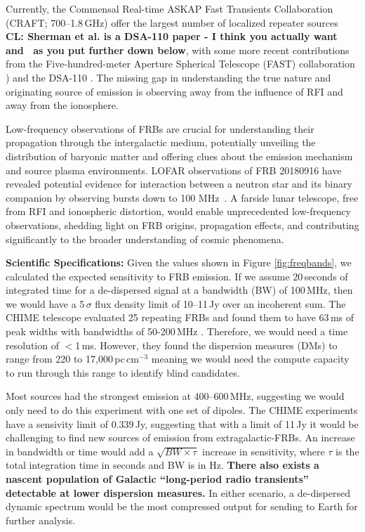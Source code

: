 Currently, the Commensal Real-time ASKAP Fast Transients Collaboration (CRAFT; 700--1.8\,GHz) offer the largest number of localized repeater sources \citep{SM_2023} \textbf{CL: Sherman et al. is a DSA-110 paper - I think you actually want~\citep{shannon2024ics} and~\citep{SD_2023} as you put further down below}, with some more recent contributions from the Five-hundred-meter Aperture Spherical Telescope (FAST) collaboration \citep[1.00--1.45\,GHz;][]{ZX_2023}) and the DSA-110 \citep{LC_2023,sharma2024preferential}. The missing gap in understanding the true nature and originating source of emission is observing away from the influence of RFI and away from the ionosphere.

Low-frequency observations of FRBs are crucial for understanding their propagation through the intergalactic medium, potentially unveiling the distribution of baryonic matter and offering clues about the emission mechanism and source plasma environments. LOFAR observations of FRB 20180916 have revealed potential evidence for interaction between a neutron star and its binary companion by observing bursts down to 100 MHz~\citep{pleunis2021lofar}. A farside lunar telescope, free from RFI and ionospheric distortion, would enable unprecedented low-frequency observations, shedding light on FRB origins, propagation effects, and contributing significantly to the broader understanding of cosmic phenomena.

\textbf{Scientific Specifications:} Given the values shown in Figure \ref{fig:freqbands}, we calculated the expected sensitivity to FRB emission. If we assume 20\,seconds of integrated time for a de-dispersed signal at a bandwidth (BW) of 100\,MHz, then we would have a 5\,$\sigma$ flux density limit of 10--11\,Jy over an incoherent sum. The CHIME telescope evaluated 25 repeating FRBs and found them to have 63\,ms of peak widths with bandwidths of 50-200\,MHz \citep{CHIME_RepeatingFRB}. Therefore, we would need a time resolution of $<$1\,ms. However, they found the dispersion measures (DMs) to range from 220 to 17,000\,pc\,cm$^{-3}$ meaning we would need the compute capacity to run through this range to identify blind candidates. 

Most sources had the strongest emission at 400--600\,MHz, suggesting we would only need to do this experiment with one set of dipoles. The CHIME experiments have a sensivity limit of 0.339\,Jy, suggesting that with a limit of 11\,Jy it would be challenging to find new sources of emission from extragalactic-FRBs. An increase in bandwidth or time would add a $\sqrt{BW\times\tau}$ increase in sensitivity, where $\tau$ is the total integration time in seconds and BW is in Hz. \textbf{There also exists a nascent population of Galactic ``long-period radio transients''~\citep{hurleywalker2022radio} detectable at lower dispersion measures.} In either scenario, a de-dispersed dynamic spectrum would be the most compressed output for sending to Earth for further analysis.

